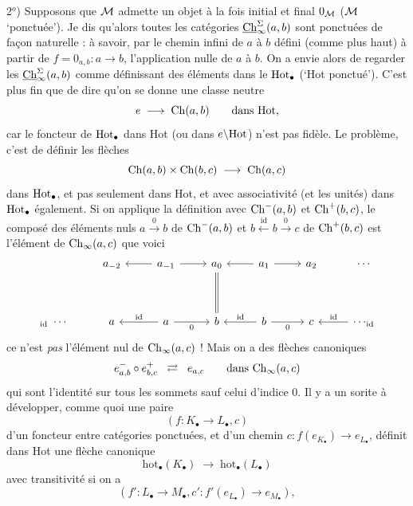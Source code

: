 2$^o$) Supposons que $\mathcal{M}$ admette un objet à la fois initial et final $0_{\mathcal{M}}$ ($\mathcal{M}$ `ponctuée'). Je dis qu'alors toutes les catégories $\underline{\mathrm{Ch}}^{\Sigma}_{\infty}(a,b)$ sont ponctuées de façon naturelle : à savoir, par le chemin infini de $a$ à $b$ défini (comme plus haut) à partir de $f = 0_{a,b} : a \longrightarrow b$, l'application nulle de $a$ à $b$. On a envie alors de regarder les $\underline{\mathrm{Ch}}^{\Sigma}_{\infty}(a,b)$ comme définissant des éléments dans le $\mathrm{Hot}_{\bullet}$ (`Hot ponctué'). C'est plus fin que de dire qu'on se donne une classe neutre
\[
e \;\longrightarrow\; \mathrm{Ch}(a,b) \qquad \text{dans Hot,}
\]
car le foncteur de $\mathrm{Hot}_{\bullet}$ dans Hot (ou dans $e\backslash\mathrm{Hot}$) n'est pas fidèle. Le problème, c'est de définir les flèches
\[
\mathrm{Ch}(a,b)\times\mathrm{Ch}(b,c) \;\longrightarrow\; \mathrm{Ch}(a,c)
\]
dans $\mathrm{Hot}_{\bullet}$, et pas seulement dans Hot, et avec associativité (et les unités) dans $\mathrm{Hot}_{\bullet}$ également. Si on applique la définition avec $\mathrm{Ch}^{-}(a,b)$ et $\mathrm{Ch}^{+}(b,c)$, le composé des éléments nuls $a \xrightarrow{\ 0\ } b$ de $\mathrm{Ch}^{-}(a,b)$ et $b \xleftarrow{\ \mathrm{id}\ } b \xrightarrow{\ 0\ } c$ de $\mathrm{Ch}^{+}(b,c)$
est l'élément de $\mathrm{Ch}_{\infty}(a,c)$ que voici
\[
\begin{tikzcd}[row sep=huge]
 & a_{-2} & a_{-1} \arrow[l] \arrow[r] & a_{0} \arrow[d, equal] & a_{1} \arrow[l] \arrow[r] & a_{2} & \cdots \\
{}_{\mathrm{id}}\ \cdots & a & a \arrow[l, "\mathrm{id}"'] \arrow[r, "0"'] & b & b \arrow[l, "\mathrm{id}"'] \arrow[r, "0"'] & c & \cdots_{\mathrm{id}} \arrow[l, "\mathrm{id}"']
\end{tikzcd}
\]
ce n'est \textit{pas} l'élément nul de $\mathrm{Ch}_{\infty}(a,c)$ ! Mais on a des flèches canoniques
\[
e^{-}_{a,b}\circ e^{+}_{b,c} \;\;\rightleftarrows\;\; e_{a,c} \qquad \text{dans } \mathrm{Ch}_{\infty}(a,c)
\]
qui sont l'identité sur tous les sommets sauf celui d'indice 0. Il y a un sorite à développer, comme quoi une paire
\[
(f : K_{\bullet} \longrightarrow L_{\bullet}, c)
\]
d'un foncteur entre catégories ponctuées, et d'un chemin $c : f(e_{K_{\bullet}}) \longrightarrow e_{L_{\bullet}}$, définit dans Hot une flèche canonique
\[
\mathrm{hot}_{\bullet}(K_{\bullet}) \;\longrightarrow\; \mathrm{hot}_{\bullet}(L_{\bullet})
\]
avec transitivité si on a
\[
(f' : L_{\bullet} \longrightarrow M_{\bullet}, c' : f'(e_{L_{\bullet}}) \longrightarrow e_{M_{\bullet}}),
\]

